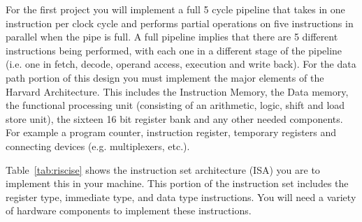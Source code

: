 \documentclass{article}
\begin{document}
For the first project you will implement a full 5 cycle pipeline that takes in one instruction per clock cycle and performs partial operations on five instructions in parallel when the pipe is full. A full pipeline implies that there are 5 different instructions being performed, with each one in a different stage of the pipeline (i.e. one in fetch, decode, operand access, execution and write back). For the data path portion of this design you must implement the major elements of the Harvard Architecture. This includes the Instruction Memory, the Data memory, the functional processing unit (consisting of an arithmetic, logic, shift and load store unit), the sixteen 16 bit register bank and any other needed components. For example a program counter, instruction register, temporary registers and connecting devices (e.g. multiplexers, etc.). 

Table~\ref{tab:riscise} shows the instruction set architecture (ISA) you are to implement this in your machine. This portion of the instruction set includes the register type, immediate type, and data type instructions. You will need a variety of hardware components to implement these instructions.
\end{document}
